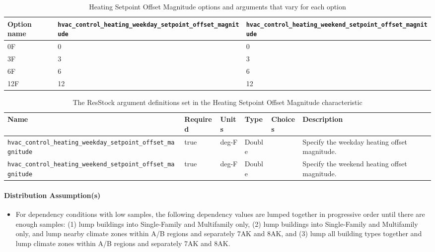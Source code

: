 \begin{longtable}[]{ |p{}|p{4cm}|p{4cm}| }
\caption{Heating Setpoint Offset Magnitude options and arguments that vary for each option} \label{table:hc_opt_ht_stp_mag} \\  
\toprule\noalign{}
Option name &
\texttt{hvac\_control\_heating\_weekday\_setpoint\_offset\_magnitude} &
\texttt{hvac\_control\_heating\_weekend\_setpoint\_offset\_magnitude} \\
\midrule\noalign{}
\endhead
\bottomrule\noalign{}
\endlastfoot
0F & 0 & 0 \\
3F & 3 & 3 \\
6F & 6 & 6 \\
12F & 12 & 12 \\
\end{longtable}

\begin{longtable}[]{ |p{}|p{1.5cm}|p{1cm}|p{1.1cm}|p{1.4cm}|p{6cm}| }
\caption{The ResStock argument definitions set in the Heating Setpoint Offset Magnitude characteristic} \label{table:hc_arg_def_ht_stp_mag} \\
\toprule\noalign{}
Name & Required & Units & Type & Choices & Description \\
\midrule\noalign{}
\endhead
\bottomrule\noalign{}
\endlastfoot
\texttt{hvac\_control\_heating\_weekday\_setpoint\_offset\_magnitude} &
true & deg-F & Double & & Specify the weekday heating offset
magnitude. \\
\hline
\texttt{hvac\_control\_heating\_weekend\_setpoint\_offset\_magnitude} &
true & deg-F & Double & & Specify the weekend heating offset
magnitude. \\
\end{longtable}

\paragraph{Distribution Assumption(s)}
\begin{itemize}
    \item For dependency conditions with low samples, the following dependency values are lumped together in progressive order until there are enough samples: (1) lump buildings into Single-Family and Multifamily only, (2) lump buildings into Single-Family and Multifamily only, and lump nearby climate zones within A/B regions and separately 7AK and 8AK, and (3) lump all building types together and lump climate zones within A/B regions and separately 7AK and 8AK.
\end{itemize}

